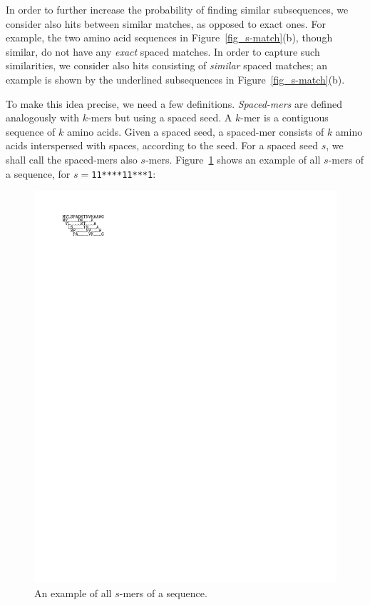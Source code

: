 In order to further increase the probability of finding similar subsequences, we consider also hits between similar matches, as opposed to exact ones. For example, the two amino acid sequences in Figure~\ref{fig_s-match}(b), though similar, do not have any \textit{exact} spaced matches. In order to capture such similarities, we consider also hits consisting of \textit{similar} spaced matches; an example is shown by the underlined subsequences in Figure~\ref{fig_s-match}(b).

To make this idea precise, we need a few definitions. {\it Spaced-mers} are defined analogously with $k$-mers but using a spaced seed. A $k$-mer is a contiguous sequence of $k$ amino acids. Given a spaced seed, a spaced-mer consists of $k$ amino acids interspersed with spaces, according to the seed. For a spaced seed $s$, we shall call the spaced-mers also $s$-mers. Figure~\ref{fig_s-mers} shows an example of all $s$-mers of a sequence, for $s=${\tt 11****11***1}:

\begin{figure}[h!]
\centering
\includegraphics{img/fig_s-mers.pdf}
\caption{An example of all $s$-mers of a sequence.\label{fig_s-mers}}
\end{figure}

